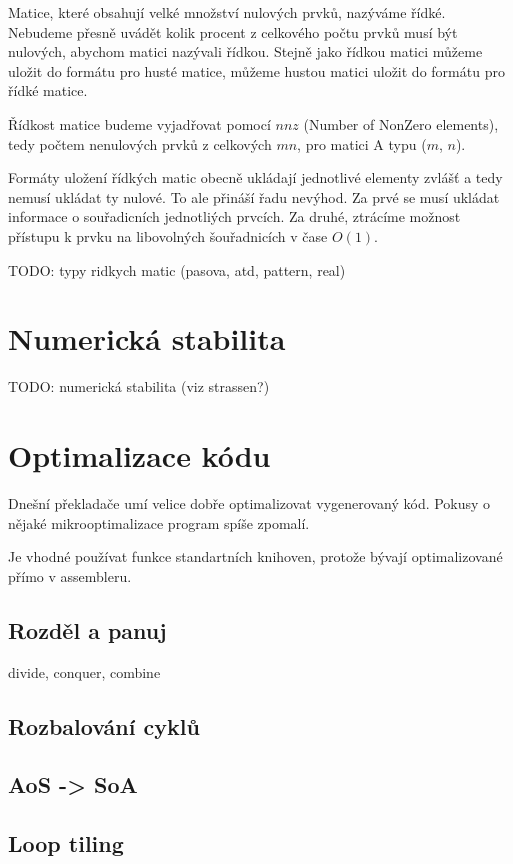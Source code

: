 \documentclass[thesis=B,czech]{FITthesis}[2012/06/26]
\begin{document}
Matice, které obsahují velké množství nulových prvků, nazýváme řídké. Nebudeme přesně uvádět kolik procent z celkového počtu prvků musí být nulových, abychom matici nazývali řídkou. Stejně jako řídkou matici můžeme uložit do formátu pro husté matice, můžeme hustou matici uložit do formátu pro řídké matice.

Řídkost matice budeme vyjadřovat pomocí $nnz$ (Number of NonZero elements), tedy počtem nenulových prvků z celkových $mn$, pro matici A typu ($m$, $n$).

Formáty uložení řídkých matic obecně ukládají jednotlivé elementy zvlášť a tedy nemusí ukládat ty nulové. To ale přináší řadu nevýhod. Za prvé se musí ukládat informace o souřadicních jednotliých prvcích. Za druhé, ztrácíme možnost přístupu k prvku na libovolných šouřadnicích v čase $O(1)$. 

TODO: typy ridkych matic (pasova, atd, pattern, real)

\section{Numerická stabilita}

TODO: numerická stabilita (viz strassen?)

\section{Optimalizace kódu}

Dnešní překladače umí velice dobře optimalizovat vygenerovaný kód. Pokusy o nějaké mikrooptimalizace program spíše zpomalí.

Je vhodné používat funkce standartních knihoven, protože bývají optimalizované přímo v assembleru.

\subsection{Rozděl a panuj}
divide, conquer, combine

\subsection{Rozbalování cyklů}

\subsection{AoS -> SoA}

\subsection{Loop tiling}
\end{document}
